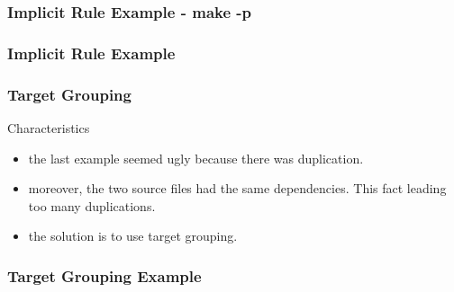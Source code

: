 \documentclass{beamer}
\begin{document}

\begin{frame}
  \frametitle{Implicit Rule Example - {\small make -p}}

  \begin{Example}
    
  \end{Example}

  \begin{Example}
    
  \end{Example}

\end{frame}


\begin{frame}
  \frametitle{Implicit Rule Example}

  \begin{Example}
    
  \end{Example}

\end{frame}


\begin{frame}
  \frametitle{Target Grouping}

  \begin{block}{Characteristics}
    \begin{itemize}
      \item
        the last example seemed ugly because there was duplication.
      \item
        moreover, the two source files had the same dependencies. This
        fact leading too many duplications.
      \item
        the solution is to use target grouping.
    \end{itemize}
  \end{block}

\end{frame}


\begin{frame}
  \frametitle{Target Grouping Example}

  \begin{Example}
    
  \end{Example}

\end{frame}
\end{document}
